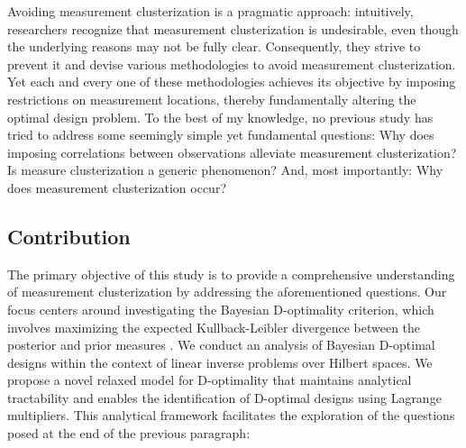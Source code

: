 Avoiding measurement clusterization is a pragmatic approach:
intuitively, researchers recognize that measurement clusterization is
undesirable, even though the underlying reasons may not be fully
clear. Consequently, they strive to prevent it and devise various
methodologies to avoid measurement clusterization. Yet each and every
one of these methodologies achieves its objective by imposing
restrictions on measurement locations, thereby fundamentally altering
the optimal design problem. To the best of my knowledge, no previous
study has tried to address some seemingly simple yet fundamental
questions:
%
Why does imposing correlations between observations alleviate
measurement clusterization?
%
Is measure clusterization a generic phenomenon?
%
And, most importantly: Why does measurement clusterization occur?
%
%


\subsection{Contribution}
The primary objective of this study is to provide a comprehensive
understanding of measurement clusterization by addressing the
aforementioned questions. Our focus centers around investigating the
Bayesian D-optimality criterion, which involves maximizing the
expected Kullback-Leibler divergence between the posterior and prior
measures \cite{CoverThomas91, Chaloner1995}. We conduct an analysis of
Bayesian D-optimal designs within the context of linear inverse
problems over Hilbert spaces. We propose a novel relaxed model for
D-optimality that maintains analytical tractability and enables the
identification of D-optimal designs using Lagrange multipliers. This
analytical framework facilitates the exploration of the questions
posed at the end of the previous paragraph:


